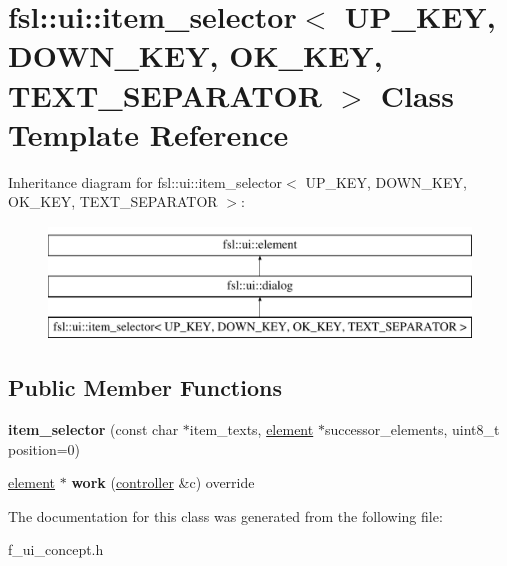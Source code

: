 \hypertarget{classfsl_1_1ui_1_1item__selector}{}\section{fsl\+::ui\+::item\+\_\+selector$<$ U\+P\+\_\+\+K\+EY, D\+O\+W\+N\+\_\+\+K\+EY, O\+K\+\_\+\+K\+EY, T\+E\+X\+T\+\_\+\+S\+E\+P\+A\+R\+A\+T\+OR $>$ Class Template Reference}
\label{classfsl_1_1ui_1_1item__selector}
Inheritance diagram for fsl\+::ui\+::item\+\_\+selector$<$ U\+P\+\_\+\+K\+EY, D\+O\+W\+N\+\_\+\+K\+EY, O\+K\+\_\+\+K\+EY, T\+E\+X\+T\+\_\+\+S\+E\+P\+A\+R\+A\+T\+OR $>$\+:\begin{figure}[H]
\begin{center}
\leavevmode
\includegraphics[height=3.000000cm]{classfsl_1_1ui_1_1item__selector}
\end{center}
\end{figure}
\subsection*{Public Member Functions}
\begin{DoxyCompactItemize}
\item 
\mbox{\label{classfsl_1_1ui_1_1item__selector_af71bc09fd608bd92805a04c8db18b598}} 
{\bfseries item\+\_\+selector} (const char $\ast$item\+\_\+texts, \mbox{\hyperlink{classfsl_1_1ui_1_1element}{element}} $\ast$successor\+\_\+elements, uint8\+\_\+t position=0)
\item 
\mbox{\label{classfsl_1_1ui_1_1item__selector_aea76b18367833061dddd85debb52c9c0}} 
\mbox{\hyperlink{classfsl_1_1ui_1_1element}{element}} $\ast$ {\bfseries work} (\mbox{\hyperlink{classfsl_1_1ui_1_1controller}{controller}} \&c) override
\end{DoxyCompactItemize}


The documentation for this class was generated from the following file\+:\begin{DoxyCompactItemize}
\item 
f\+\_\+ui\+\_\+concept.\+h\end{DoxyCompactItemize}
